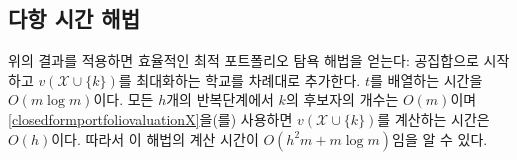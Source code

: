 \documentclass[11pt]{article} %
\DeclareMathOperator*{\argmax}{arg\,max}
\newif\ifen
\newtheorem{theorem}{Theorem}
\theoremstyle{definition}
\newtheorem{theorem}{정리}
\theoremstyle{definition}
\begin{document}
\ifen \subsection{Polynomial-time solution} \else \subsection{다항 시간 해법}\fi
\ifen Applying the result above yields an efficient greedy algorithm for the optimal portfolio: Start with the empty set and add schools one at a time, maximizing $v(\mathcal{X}\cup \{k\})$ at each addition. Sorting $t$ is  $O(m \log m)$.  At each of the $h$ iterations, there are $O(m)$ candidates for $k$, and computing $v(\mathcal{X}\cup \{k\})$ is $O(h)$ using \eqref{closedformportfoliovaluationX}; therefore, the time complexity of this algorithm is $O(h^2 m + m \log m)$. 
\else 위의 결과를 적용하면 효율적인 최적 포트폴리오 탐욕 해법을 얻는다: 공집합으로 시작하고 $v(\mathcal{X}\cup \{k\})$를 최대화하는 학교를 차례대로 추가한다. $t$를 배열하는 시간을 $O(m \log m)$이다. 모든 $h$개의 반복단계에서 $k$의 후보자의 개수는 $O(m)$이며 \eqref{closedformportfoliovaluationX}을(를) 사용하면 $v(\mathcal{X}\cup \{k\})$를 계산하는 시간은 $O(h)$이다. 따라서 이 해법의 계산 시간이 $O(h^2 m + m \log m)$임을 알 수 있다.\fi
%
\end{document}
